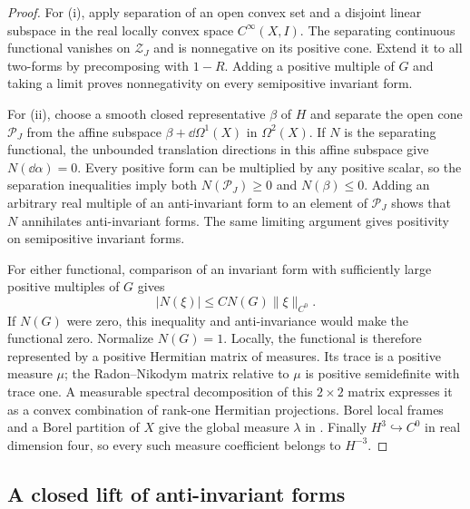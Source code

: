 \begin{proof}
For \textup{(i)}, apply separation of an open convex set and a disjoint
linear subspace in the real locally convex space $C^\infty(X,I)$.
The separating continuous functional vanishes on $\mathcal Z_J$ and is
nonnegative on its positive cone.  Extend it to all two-forms by
precomposing with $1-R$.  Adding a positive multiple of $G$ and taking
a limit proves nonnegativity on every semipositive invariant form.

For \textup{(ii)}, choose a smooth closed representative $\beta$ of $H$
and separate the open cone $\mathcal P_J$ from the affine subspace
$\beta+\dd\Omega^1(X)$ in $\Omega^2(X)$.  If $N$ is the separating
functional, the unbounded translation directions in this affine subspace
give $N(\dd\alpha)=0$.  Every positive form can be multiplied by any
positive scalar, so the separation inequalities imply both
$N(\mathcal P_J)\ge0$ and $N(\beta)\le0$.  Adding an arbitrary real
multiple of an anti-invariant form to an element of $\mathcal P_J$ shows
that $N$ annihilates anti-invariant forms.  The same limiting argument
gives positivity on semipositive invariant forms.

For either functional, comparison of an invariant form with sufficiently
large positive multiples of $G$ gives
\[
 |N(\xi)|\le C N(G)\|\xi\|_{C^0}.
\]
If $N(G)$ were zero, this inequality and anti-invariance would make the
functional zero.  Normalize $N(G)=1$.  Locally, the functional is therefore
represented by a positive Hermitian matrix of measures.  Its trace is a
positive measure $\mu$; the Radon--Nikodym matrix relative to $\mu$ is
positive semidefinite with trace one.  A measurable spectral decomposition
of this $2\times2$ matrix expresses it as a convex combination of rank-one
Hermitian projections.  Borel local frames and a Borel partition of $X$
give the global measure $\lambda$ in
.  Finally $H^3\hookrightarrow C^0$ in real
dimension four, so every such measure coefficient belongs to $H^{-3}$.
\end{proof}

\subsection{A closed lift of anti-invariant forms}


